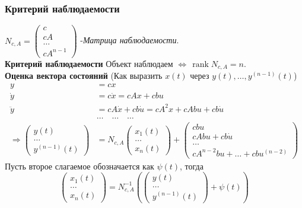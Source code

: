\documentclass[A4]{article}
\begin{document}
\subsubsection{Критерий наблюдаемости}
$N_{c,A}=\left(\begin{array}{c}
c\\cA\\\ldots\\cA^{n-1}
\end{array}\right)$ -\emph{Матрица наблюдаемости}.\\
\textbf{Критерий наблюдаемости} Объект наблюдаем $\Leftrightarrow\,\operatorname{rank}N_{c,A}=n$.\\
\textbf{Оценка вектора состояний }(Как выразить $x(t)$ через $y(t),\ldots,y^{(n-1)}(t)$)\\
\begin{equation}
\begin{aligned}
y&=cx\\
\dot{y}&=c\dot{x}=cAx+cbu\\
\ddot{y}&=cA\dot{x}+cb\dot{u}=cA^2x+cAbu+cb\dot{u}\\
&\ldots\quad\ldots\quad\ldots\\
\Rightarrow\left(\begin{array}{c}
y(t)\\\ldots\\y^{(n-1)}(t)
\end{array}\right)&=N_{c,A}\left(\begin{array}{c}
x_1(t)\\\ldots\\x_n(t)
\end{array}\right)+\left(\begin{array}{c}
cbu\\cAbu+cb\dot{u}\\\ldots\\cA^{n-2}bu+\ldots+cbu^{(n-2)}
\end{array}\right)
\end{aligned}
\end{equation}
Пусть второе слагаемое обозначается как $\psi(t)$, тогда
\begin{equation}
\left(\begin{array}{c}
x_1(t)\\\ldots\\x_n(t)
\end{array}\right)=N_{c,A}^{-1}\left(
\left(\begin{array}{c}
y(t)\\\ldots\\y^{(n-1)}(t)
\end{array}\right)
+\psi(t)\right)
\end{equation}
\end{document}
